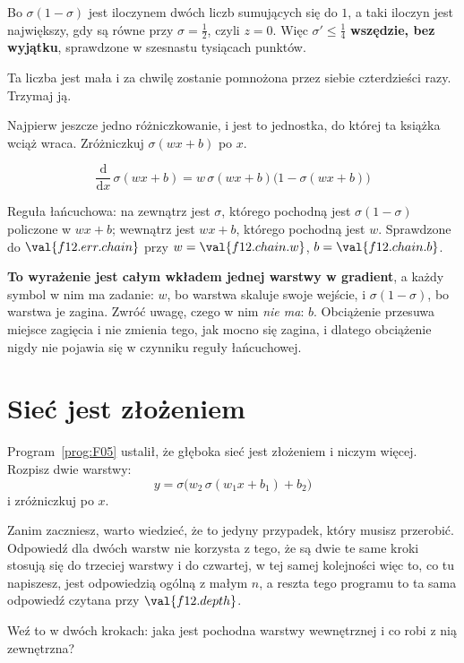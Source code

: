 \begin{fr}
Bo $\sigma(1-\sigma)$ jest iloczynem dwóch liczb sumujących się do $1$, a taki
iloczyn jest największy, gdy są równe \dash{} przy $\sigma = \frac{1}{2}$,
czyli $z = 0$. Więc $\sigma' \le \frac{1}{4}$ \textbf{wszędzie, bez wyjątku},
sprawdzone w szesnastu tysiącach punktów.

Ta liczba jest mała i za chwilę zostanie pomnożona przez siebie czterdzieści
razy. Trzymaj ją.

Najpierw jeszcze jedno różniczkowanie, i jest to jednostka, do której ta
książka wciąż wraca. Zróżniczkuj $\sigma(wx + b)$ po $x$.
\nextframe
\end{fr}

\begin{fr}
\begin{ansblock}
\[ \frac{\mathrm{d}}{\mathrm{d}x}\,\sigma(wx+b)
   = w\,\sigma(wx+b)\bigl(1 - \sigma(wx+b)\bigr) \]
\end{ansblock}

Reguła łańcuchowa: na zewnątrz jest $\sigma$, którego pochodną jest
$\sigma(1-\sigma)$ policzone w $wx+b$; wewnątrz jest $wx+b$, którego pochodną
jest $w$. Sprawdzone do $\val{f12.err.chain}$ przy
$w = \val{f12.chain.w}$, $b = \val{f12.chain.b}$.

\textbf{To wyrażenie jest całym wkładem jednej warstwy w gradient}, a każdy
symbol w nim ma zadanie: $w$, bo warstwa skaluje swoje wejście, i
$\sigma(1-\sigma)$, bo warstwa je zagina. Zwróć uwagę, czego w nim
\emph{nie ma}: $b$. Obciążenie przesuwa miejsce zagięcia i nie zmienia tego,
jak mocno się zagina, i dlatego obciążenie nigdy nie pojawia się w czynniku
reguły łańcuchowej.
\end{fr}

\section{Sieć jest złożeniem}
\label{sec:F12-network}

\begin{fr}
Program~\ref{prog:F05} ustalił, że głęboka sieć jest złożeniem i niczym
więcej. Rozpisz dwie warstwy:
\[ y = \sigma\bigl(w_2\,\sigma(w_1 x + b_1) + b_2\bigr) \]
i zróżniczkuj po $x$.

Zanim zaczniesz, warto wiedzieć, że to jedyny przypadek, który musisz
przerobić. Odpowiedź dla dwóch warstw nie korzysta z tego, że są dwie
\dash{} te same kroki stosują się do trzeciej warstwy i do czwartej, w tej
samej kolejności \dash{} więc to, co tu napiszesz, jest odpowiedzią ogólną z
małym $n$, a reszta tego programu to ta sama odpowiedź czytana przy
$\val{f12.depth}$.

Weź to w dwóch krokach: jaka jest pochodna warstwy wewnętrznej i co robi z nią
zewnętrzna?
\dotline
\nextframe
\end{fr}

